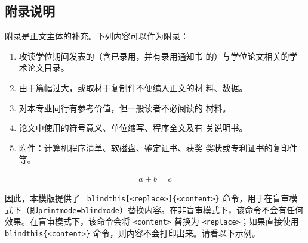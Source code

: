 \begin{appendixenv}
    \chapter{附录说明}
    
    附录是正文主体的补充。下列内容可以作为附录：
    \begin{enumerate}
        \item 攻读学位期间发表的（含已录用，并有录用通知书
        的）与学位论文相关的学术论文目录。
        \item 由于篇幅过大，或取材于复制件不便编入正文的材
        料、数据。
        \item 对本专业同行有参考价值，但一般读者不必阅读的
        材料。
        \item 论文中使用的符号意义、单位缩写、程序全文及有
        关说明书。
        \item 附件：计算机程序清单、软磁盘、鉴定证书、获奖
        奖状或专利证书的复印件等。
    \end{enumerate}
    
    \begin{align}
        a+b=c
    \end{align}
    


    因此，本模版提供了 \texttt{ blindthis[<replace>]\{<content>\}} 命令，用于在盲审模式下（即\texttt{printmode=blindmode}）替换内容。在非盲审模式下，该命令不会有任何效果。在盲审模式下，该命令会将 \texttt{<content>} 替换为 \texttt{<replace>}；如果直接使用 \texttt{ blindthis\{<content>\}} 命令，则内容不会打印出来。请看以下示例。
    

\end{appendixenv}
